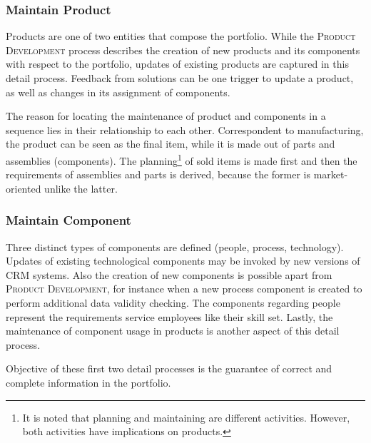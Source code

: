 	
	\subsubsection{Maintain Product}
	Products are one of two entities that compose the portfolio. While the \textsc{Product Development} process describes the creation of new products and its components with respect to the portfolio, updates of existing products are captured in this detail process. Feedback from solutions can be one trigger to update a product, as well as changes in its assignment of components. 
	
	The reason for locating the maintenance of product and components in a sequence lies in their relationship to each other. Correspondent to manufacturing, the product can be seen as the final item, while it is made out of parts and assemblies (components). The planning\footnote{It is noted that planning and maintaining are different activities. However, both activities have implications on products.} of sold items is made first and then the requirements of assemblies and parts is derived, because the former is market-oriented unlike the latter. 
	
	\subsubsection{Maintain Component}
	Three distinct types of components are defined (people, process, technology). Updates of existing technological components may be invoked by new versions of \acrshort{CRM} systems. Also the creation of new components is possible apart from \textsc{Product Development}, for instance when a new process component is created to perform additional data validity checking. The components regarding people represent the requirements \wrt service employees like their skill set. Lastly, the maintenance of component usage in products is another aspect of this detail process. 
	
	Objective of these first two detail processes is the guarantee of correct and complete information in the portfolio.
	
